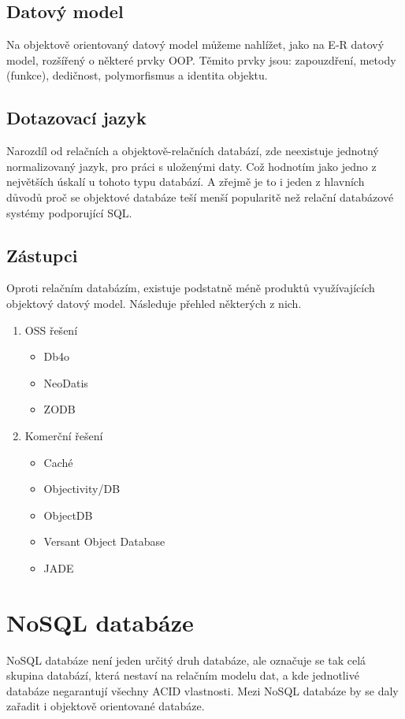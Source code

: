 \subsection{Datový model}
Na objektově orientovaný datový model můžeme nahlížet, jako na E-R datový model, rozšířený o některé prvky OOP. Těmito prvky jsou: zapouzdření, metody (funkce), dedičnost, polymorfismus a identita objektu.

\subsection{Dotazovací jazyk}
Narozdíl od relačních a objektově-relačních databází, zde neexistuje jednotný normalizovaný jazyk, pro práci s uloženými daty. Což hodnotím jako jedno z největších úskalí u tohoto typu databází. A zřejmě je to i jeden z hlavních důvodů proč se objektové databáze teší menší popularitě než relační databázové systémy podporující SQL.
 
\subsection{Zástupci}
Oproti relačním databázím, existuje podstatně méně produktů využívajících objektový datový model. Následuje přehled některých z nich.
\begin{enumerate}
  \item OSS řešení
  \begin{itemize}
    \item Db4o
    \item NeoDatis
    \item ZODB
  \end{itemize}
  \item Komerční řešení
  \begin{itemize}
    \item Caché
    \item Objectivity/DB
    \item ObjectDB
    \item Versant Object Database
    \item JADE
  \end{itemize}
\end{enumerate}

\section{NoSQL databáze}
NoSQL databáze není jeden určitý druh databáze, ale označuje se tak celá skupina databází, která nestaví na relačním modelu dat, a kde jednotlivé databáze negarantují všechny ACID vlastnosti. Mezi NoSQL databáze by se daly zařadit i objektově orientované databáze.

